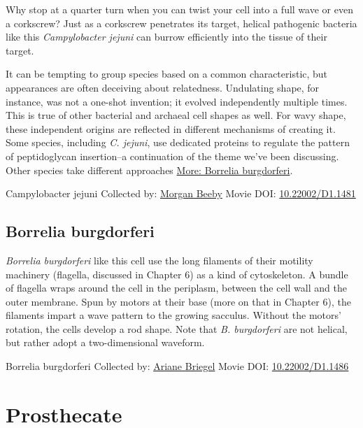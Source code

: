 \documentclass[]{tufte-book}
\begin{document}
Why stop at a quarter turn when you can twist your cell into a full wave or even a corkscrew? Just as a corkscrew penetrates its target, helical pathogenic bacteria like this \emph{Campylobacter jejuni} can burrow efficiently into the tissue of their target.

It can be tempting to group species based on a common characteristic, but appearances are often deceiving about relatedness. Undulating shape, for instance, was not a one-shot invention; it evolved independently multiple times. This is true of other bacterial and archaeal cell shapes as well. For wavy shape, these independent origins are reflected in different mechanisms of creating it. Some species, including \emph{C. jejuni}, use dedicated proteins to regulate the pattern of peptidoglycan insertion--a continuation of the theme we've been discussing. Other species take different approaches \protect\hyperlink{Borrelia_burgdorferi}{More: Borrelia burgdorferi}.



\hypertarget{htmlwidget-d7f200395a6606be6502}{}

\label{fig:3-5}Campylobacter jejuni Collected by: \protect\hyperlink{morgan_beeby}{Morgan Beeby} Movie DOI: \href{https://doi.org/10.22002/D1.1481}{10.22002/D1.1481}

\hypertarget{Borrelia_burgdorferi}{%
\subsection{Borrelia burgdorferi}\label{Borrelia_burgdorferi}}

\emph{Borrelia burgdorferi} like this cell use the long filaments of their motility machinery (flagella, discussed in Chapter 6) as a kind of cytoskeleton. A bundle of flagella wraps around the cell in the periplasm, between the cell wall and the outer membrane. Spun by motors at their base (more on that in Chapter 6), the filaments impart a wave pattern to the growing sacculus. Without the motors' rotation, the cells develop a rod shape. Note that \emph{B. burgdorferi} are not helical, but rather adopt a two-dimensional waveform.



\hypertarget{htmlwidget-cf76599aa7ce438ffe8b}{}

\label{fig:3-5a}Borrelia burgdorferi Collected by: \protect\hyperlink{ariane_briegel}{Ariane Briegel} Movie DOI: \href{https://doi.org/10.22002/D1.1486}{10.22002/D1.1486}

\hypertarget{prosthecate}{%
\section{Prosthecate}\label{prosthecate}}
\end{document}
